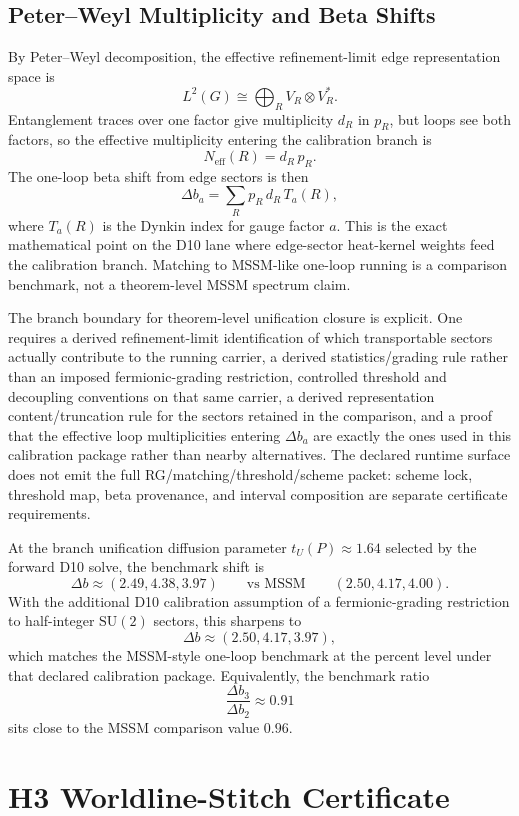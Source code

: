 \subsection{Peter--Weyl Multiplicity and Beta Shifts}

By Peter--Weyl decomposition, the effective refinement-limit edge representation space is
\[
L^2(G)\cong \bigoplus_R V_R\otimes V_R^*.
\]
Entanglement traces over one factor give multiplicity \(d_R\) in \(p_R\), but loops see both
factors, so the effective multiplicity entering the calibration branch is
\[
N_{\mathrm{eff}}(R)=d_R\,p_R.
\]
The one-loop beta shift from edge sectors is then
\[
\Delta b_a=\sum_R p_R\,d_R\,T_a(R),
\]
where \(T_a(R)\) is the Dynkin index for gauge factor \(a\). This is the exact mathematical point
on the D10 lane where edge-sector heat-kernel weights feed the calibration branch. Matching to
MSSM-like one-loop running is a comparison benchmark, not a theorem-level
MSSM spectrum claim.

The branch boundary for theorem-level unification closure is explicit. One requires a derived
refinement-limit identification of which transportable sectors actually contribute to the running
carrier, a derived statistics/grading rule rather than an imposed fermionic-grading restriction,
controlled threshold and decoupling conventions on that same carrier, a derived representation
content/truncation rule for the sectors retained in the comparison, and a proof that the effective
loop multiplicities entering \(\Delta b_a\) are exactly the ones used in this calibration package
rather than nearby alternatives. The declared runtime surface does not emit the
full RG/matching/threshold/scheme packet: scheme lock, threshold map,
beta provenance, and interval composition are separate certificate requirements.

At the branch unification diffusion parameter \(t_U(P)\approx 1.64\) selected by the forward D10
solve, the benchmark shift is
\[
\Delta b\approx (2.49,4.38,3.97)
\qquad
\text{vs MSSM}
\qquad
(2.50,4.17,4.00).
\]
With the additional D10 calibration assumption of a fermionic-grading restriction to
half-integer \(\mathrm{SU}(2)\) sectors, this sharpens to
\[
\Delta b\approx (2.50,4.17,3.97),
\]
which matches the MSSM-style one-loop benchmark at the percent level under that declared
calibration package. Equivalently, the benchmark ratio
\[
\frac{\Delta b_3}{\Delta b_2}\approx 0.91
\]
sits close to the MSSM comparison value \(0.96\).

\section{H3 Worldline-Stitch Certificate}\label{app:h3-worldline-certificate}

